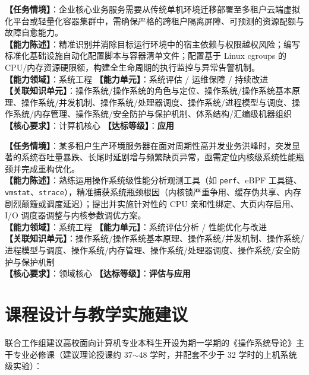\begin{taskbox}[任务 2：高可用应用在虚拟化与容器化运行时中的自动化部署与治理]
\textbf{【任务情境】}：企业核心业务服务需要从传统单机环境迁移部署至多租户云端虚拟化平台或轻量化容器集群中，需确保严格的跨租户隔离屏障、可预测的资源配额与故障自愈能力。\\
\textbf{【能力陈述】}：精准识别并消除目标运行环境中的宿主依赖与权限越权风险；编写标准化基础设施自动化配置脚本与容器清单文件；配置基于 Linux cgroups 的 CPU/内存资源硬限额，构建全生命周期的执行监控与异常告警机制。\\
\textbf{【能力领域】}：系统工程 \quad \textbf{【能力单元】}：系统评估 / 运维保障 / 持续改进\\
\textbf{【关联知识单元】}：操作系统/操作系统的角色与定位、操作系统/操作系统基本原理、操作系统/并发机制、操作系统/处理器调度、操作系统/进程模型与调度、操作系统/内存管理、操作系统/安全防护与保护机制、体系结构/汇编级机器组织\\
\textbf{【核心要求】}：计算机核心 \quad \textbf{【达标等级】}：\textbf{应用}
\end{taskbox}

\begin{taskbox}[任务 3：多租户高并发场景下操作系统资源竞争分析与性能调优]
\textbf{【任务情境】}：某多租户生产环境服务器在面对周期性高并发业务洪峰时，突发显著的系统吞吐量暴跌、长尾时延剧增与频繁缺页异常，亟需定位内核级系统性能瓶颈并完成重构优化。\\
\textbf{【能力陈述】}：熟练运用操作系统级性能分析观测工具（如 \texttt{perf}、eBPF 工具链、\texttt{vmstat}、\texttt{strace}），精准捕获系统瓶颈根因（内核锁严重争用、缓存伪共享、内存剧烈颠簸或调度延迟）；提出并实施针对性的 CPU 亲和性绑定、大页内存启用、I/O 调度器调整与内核参数调优方案。\\
\textbf{【能力领域】}：系统工程 \quad \textbf{【能力单元】}：系统评估分析 / 性能优化与改进\\
\textbf{【关联知识单元】}：操作系统/操作系统基本原理、操作系统/并发机制、操作系统/进程模型与调度、操作系统/内存管理、操作系统/处理器调度、操作系统/安全防护与保护机制\\
\textbf{【核心要求】}：领域核心 \quad \textbf{【达标等级】}：\textbf{评估与应用}
\end{taskbox}

\section{课程设计与教学实施建议}

联合工作组建议高校面向计算机专业本科生开设为期一学期的《操作系统导论》主干专业必修课（建议理论授课约 37$\sim$48 学时，并配套不少于 32 学时的上机系统级实验）：

